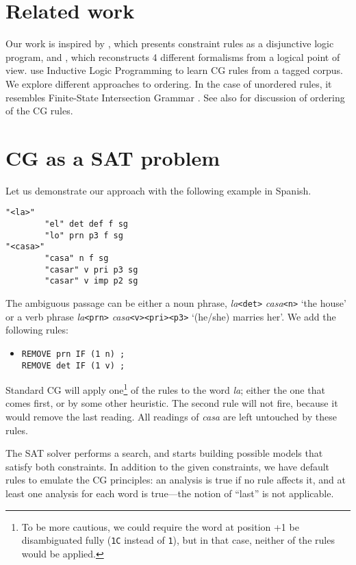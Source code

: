 \documentclass[11pt]{article}
\begin{document}
\section{Related work}
\label{sect:related}

Our work is inspired by \cite{lager98}, which presents constraint rules as a disjunctive logic program,
and \cite{lager_nivre01}, which reconstructs 4 different formalisms from a logical point of view.
\cite{lindberg_eineborg98ilp,asfrent14} use Inductive Logic Programming to learn CG rules from a tagged corpus.
We explore different approaches to ordering. In the case of unordered
rules, it resembles Finite-State Intersection Grammar \cite{koskenniemi90}.
See also \cite{lager01transformation} for discussion of ordering of the CG rules.
\section{CG as a SAT problem}
Let us demonstrate our approach with the following example in Spanish.

\begin{verbatim}
"<la>"
        "el" det def f sg
        "lo" prn p3 f sg
"<casa>"
        "casa" n f sg
        "casar" v pri p3 sg
        "casar" v imp p2 sg
\end{verbatim}

The ambiguous passage can be either a noun phrase, \emph{la}\texttt{<det>} \emph{casa}\texttt{<n>} 
`the house'  or a verb phrase \emph{la}\texttt{<prn>}  \emph{casa}\texttt{<v><pri><p3>} `(he/she) marries her'. 
We add the following rules:

\begin{itemize}
\item [] \texttt{REMOVE prn IF (1 n) ;} \\
             \texttt{REMOVE det IF (1 v) ;}
\end{itemize}

Standard CG will apply one\footnote{To be more cautious, we could require the word at position +1 be disambiguated fully (\texttt{1C} instead of \texttt{1}), but in that case, 
neither of the rules would be applied.} of the rules to the word \emph{la}; 
either the one that comes first, or by some other heuristic. 
The second rule will not fire, because it would remove the last reading. 
All readings of \emph{casa} are left untouched by these rules.

The SAT solver performs a search, 
and starts building possible models that satisfy both constraints. 
In addition to the given constraints, we have default rules to emulate
the CG principles: an analysis is true if no rule affects it,
and at least one analysis for each word is true---the notion of
``last'' is not applicable.
\end{document}
